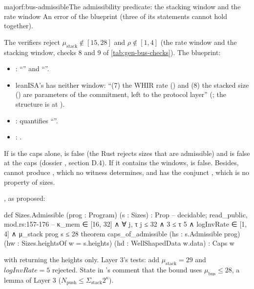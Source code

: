 \begin{finding}{major}{f:bus-admissible}{The admissibility predicate: the stacking window and the rate window}
 An error of the blueprint (three of its statements cannot hold together).

 The verifiers reject $μ_{\mathrm{stack}} ∉ [15, 28]$ and $ρ ∉ [1, 4]$ (the rate
window and the stacking window, checks 8 and 9 of \cref{tab:gen-bus-checks}). The blueprint:
\begin{itemize}
\item {}: ``''
  and ``''.
\item leanISA's  has neither window: ``(7) the WHIR rate () and (8) the
  stacked size  () are parameters of the commitment,
  left to the protocol layer'' (; the structure is at ).
\item {}:  quantifies
  ``''.
\item {}:
  .
\end{itemize}
If  is the caps alone,  is false (the Rust rejects
sizes that are admissible) and  is false at the caps (dossier
, section D.4). If it contains the windows,  is false.
Besides,  cannot produce , which no witness determines,
and  has the conjunct , which is no property of sizes.

 , as proposed:
\begin{leancode}
def Sizes.Admissible (prog : Program) (s : Sizes) : Prop   -- decidable; read_public, mod.rs:157-176
  -- κ_mem ∈ [16, 32] ∧ ∀ j, τ j ≤ 32 ∧ 3 ≤ τ 5 ∧ logInvRate ∈ [1, 4] ∧ μ_stack prog s ≤ 28
theorem caps_of_admissible (hs : s.Admissible prog) (hw : Sizes.heightsOf w = s.heights)
    (hd : WellShapedData w.data) : Caps w
\end{leancode}
with  returning the heights only. Layer 3's tests: add
$μ_{\mathrm{stack}} = 29$ and $\mathit{logInvRate} = 5$ rejected. State in
's comment that the bound uses $μ_{\mathrm{bus}} ≤ 28$, a lemma of Layer 3
($N_{\mathrm{push}} ≤ Σ_{\mathrm{stack}} 2^κ$).
\end{finding}

